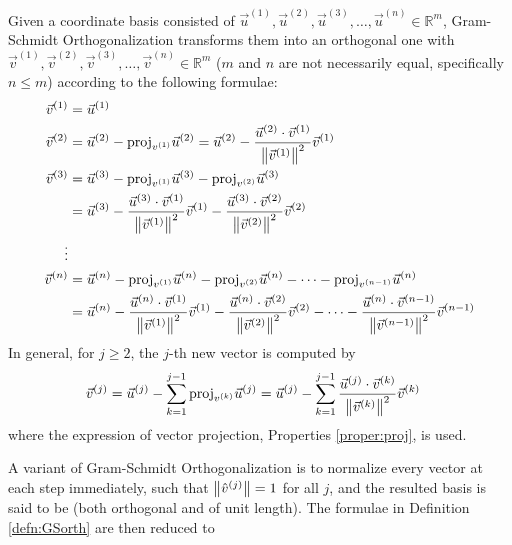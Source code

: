 \begin{defn}
\label{defn:GSorth}
Given a coordinate basis consisted of $\vec{u}^{(1)}, \vec{u}^{(2)}, \vec{u}^{(3)}, \ldots, \vec{u}^{(n)} \in \mathbb{R}^m$, Gram-Schmidt Orthogonalization transforms them into an orthogonal one with $\vec{v}^{(1)}, \vec{v}^{(2)}, \vec{v}^{(3)}, \ldots, \vec{v}^{(n)} \in \mathbb{R}^m$ ($m$ and $n$ are not necessarily equal, specifically $n \leq m$) according to the following formulae:
\begin{align}
\vec{v}^{(1)} &= \vec{u}^{(1)} \nonumber \\
\vec{v}^{(2)} &= \vec{u}^{(2)} - \text{proj}_{v^{(1)}}\vec{u}^{(2)} = \vec{u}^{(2)} - \frac{\vec{u}^{(2)} \cdot \vec{v}^{(1)}}{\norm{\vec{v}^{(1)}}^2} \vec{v}^{(1)} \nonumber \\
\vec{v}^{(3)} &= \vec{u}^{(3)} - \text{proj}_{v^{(1)}}\vec{u}^{(3)} - \text{proj}_{v^{(2)}}\vec{u}^{(3)} \\
&= \vec{u}^{(3)} - \frac{\vec{u}^{(3)} \cdot \vec{v}^{(1)}}{\norm{\vec{v}^{(1)}}^2} \vec{v}^{(1)} - \frac{\vec{u}^{(3)} \cdot \vec{v}^{(2)}}{\norm{\vec{v}^{(2)}}^2} \vec{v}^{(2)} \nonumber \\
\vdots \nonumber \\
\vec{v}^{(n)} &= \vec{u}^{(n)} - \text{proj}_{v^{(1)}}\vec{u}^{(n)} - \text{proj}_{v^{(2)}}\vec{u}^{(n)} - \cdots - \text{proj}_{v^{(n-1)}}\vec{u}^{(n)} \nonumber \\
&= \vec{u}^{(n)} - \frac{\vec{u}^{(n)} \cdot \vec{v}^{(1)}}{\norm{\vec{v}^{(1)}}^2} \vec{v}^{(1)} - \frac{\vec{u}^{(n)} \cdot \vec{v}^{(2)}}{\norm{\vec{v}^{(2)}}^2} \vec{v}^{(2)} - \cdots - \frac{\vec{u}^{(n)} \cdot \vec{v}^{(n-1)}}{\norm{\vec{v}^{(n-1)}}^2} \vec{v}^{(n-1)} \nonumber
\end{align}
In general, for $j \geq 2$, the $j$-th new vector is computed by
\begin{align}
\vec{v}^{(j)} &= \vec{u}^{(j)} - \sum_{k=1}^{j-1}\text{proj}_{v^{(k)}}\vec{u}^{(j)}  = \vec{u}^{(j)} - \sum_{k=1}^{j-1}\frac{\vec{u}^{(j)} \cdot \vec{v}^{(k)}}{\norm{\vec{v}^{(k)}}^2} \vec{v}^{(k)}
\end{align}
where the expression of vector projection, Properties \ref{proper:proj}, is used.
\end{defn}
A variant of Gram-Schmidt Orthogonalization is to normalize every vector at each step immediately, such that $\norm{\hat{v}^{(j)}} = 1$ for all $j$, and the resulted basis is said to be  (both orthogonal and of unit length). The formulae in Definition \ref{defn:GSorth} are then reduced to
